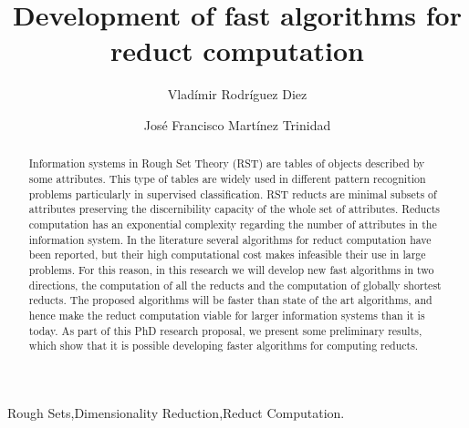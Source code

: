 \documentclass[authoryear,11pt]{elsarticle}
\begin{document}
	
	
	\title{Development of fast algorithms for reduct computation}
	
	\author{Vlad\'imir Rodr\'iguez Diez}
	\author{Jos\'e Francisco Mart\'inez Trinidad}
	
	\address{Computer Science Department\\National Institute of
	Astrophysics, Optics and Electronics\\
	Luis Enrique Erro \# 1, Santa Mar\'{\i}a Tonantzintla, Puebla,
	72840, M\'{e}xico} 
	
	
	
	\begin{abstract}
		Information systems in Rough Set Theory (RST) are tables of objects described by some attributes. 
		This type of tables are widely used in different pattern recognition problems particularly in 
		supervised classification. RST reducts are minimal subsets of attributes preserving 
		the discernibility capacity of the whole set of attributes. Reducts computation has an exponential
		complexity regarding the number of attributes in the information system. In the literature several
		algorithms for reduct computation have been reported, but their high computational cost makes 
		infeasible their use in large problems. For this reason, in this research we will develop new fast
		algorithms in two directions, the computation of all the reducts and the computation of globally 
		shortest reducts. The proposed algorithms will be faster than state of the art algorithms, and hence 
		make the reduct computation viable for larger information systems than it is today. As part of this 
		PhD research proposal, we present some preliminary results, which show that it is possible developing
		faster algorithms for computing reducts.
	\end{abstract}
	
	\begin{keyword}
		Rough Sets\sep Dimensionality Reduction\sep Reduct Computation.
	\end{keyword}

	\maketitle

\pagebreak 
\tableofcontents
\pagebreak 

\end{document}

